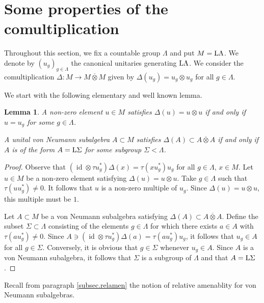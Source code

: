 \documentclass[a4paper,11pt]{amsart}
\numberwithin{equation}{section}
\newtheorem{lemma}[definition]{Lemma}
\begin{document}
\section{Some properties of the comultiplication}\label{sec.comult}

Throughout this section, we fix a countable group $\Lambda$ and put $M = {\mathord{\text{\rm L}}} \Lambda$. We denote by $(u_g)_{g \in \Lambda}$ the canonical unitaries generating ${\mathord{\text{\rm L}}} \Lambda$. We consider the comultiplication ${\Delta} : M {\rightarrow} M {\mathbin{\overline{\otimes}}} M$ given by ${\Delta}(u_g) = u_g {\otimes} u_g$ for all $g \in \Lambda$.

We start with the following elementary and well known lemma.

\begin{lemma}\label{lem.elemcomult}
A non-zero element $u \in M$ satisfies ${\Delta}(u) = u {\otimes} u$ if and only if $u = u_g$ for some $g \in \Lambda$.

A unital von Neumann subalgebra $A \subset M$ satisfies ${\Delta}(A) \subset A {\mathbin{\overline{\otimes}}} A$ if and only if $A$ is of the form $A = {\mathord{\text{\rm L}}} \Sigma$ for some subgroup $\Sigma < \Lambda$.
\end{lemma}
\begin{proof}
Observe that $({\mathord{\operatorname{id}}} {\otimes} \tau u_g^*){\Delta}(x) = \tau(x u_g^*) u_g$ for all $g \in \Lambda$, $x \in M$. Let $u \in M$ be a non-zero element satisfying ${\Delta}(u) = u {\otimes} u$. Take $g \in \Lambda$ such that $\tau(u u_g^*) \neq 0$. It follows that $u$ is a non-zero multiple of $u_g$. Since ${\Delta}(u) = u {\otimes} u$, this multiple must be $1$.

Let $A \subset M$ be a von Neumann subalgebra satisfying ${\Delta}(A) \subset A {\mathbin{\overline{\otimes}}} A$. Define the subset $\Sigma \subset \Lambda$ consisting of the elements $g \in \Lambda$ for which there exists $a \in A$ with $\tau(a u_g^*) \neq 0$. Since $A \ni ({\mathord{\operatorname{id}}} {\otimes} \tau u_g^*){\Delta}(a) = \tau(a u_g^*) u_g$, it follows that $u_g \in A$ for all $g \in \Sigma$. Conversely, it is obvious that $g \in \Sigma$ whenever $u_g \in A$. Since $A$ is a von Neumann subalgebra, it follows that $\Sigma$ is a subgroup of $\Lambda$ and that $A = {\mathord{\text{\rm L}}} \Sigma$.
\end{proof}

Recall from paragraph \ref{subsec.relamen} the notion of relative amenablity for von Neumann subalgebras.
\end{document}
